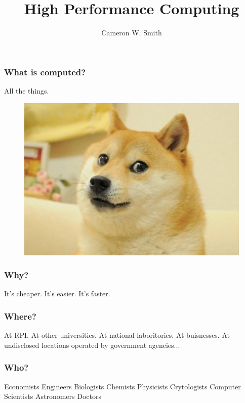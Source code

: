 \documentclass{beamer}
\begin{document}
\title[HPC]
{High Performance Computing}
\author[smithc11@rpi.edu]{Cameron W. Smith}

\begin{frame}[plain]
  \titlepage
\end{frame}

\begin{frame}
  \frametitle{What is computed?}
  \center All the things.
  \begin{figure} \centering
    \includegraphics[width=.8\textwidth]{figs/plainDogeZoom.png}
  \end{figure}
\end{frame}

\begin{frame}
  \frametitle{Why?}
  \center It's cheaper.
  \center It's easier.
  \center It's faster.
\end{frame}

\begin{frame}
  \frametitle{Where?}
  \center At RPI.
  \center At other universities.
  \center At national laboritories.
  \center At buisnesses.
  \center At undisclosed locations operated by government agencies...
\end{frame}

\begin{frame}
  \frametitle{Who?}
  \center Economists
  \center Engineers
  \center Biologists
  \center Chemists
  \center Physicists
  \center Crytologists
  \center Computer Scientists
  \center Astronomers
  \center Doctors
\end{frame}
\end{document}

